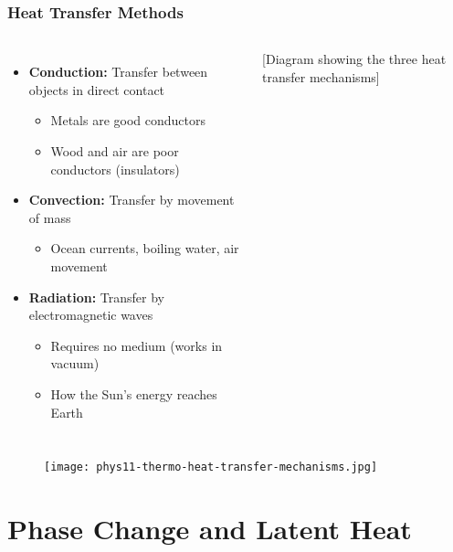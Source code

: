 \documentclass{beamer}
\begin{document}
\begin{frame}
    \frametitle{Heat Transfer Methods}
    \begin{columns}
        \begin{itemize}
            \item \textbf{Conduction:} Transfer between objects in direct contact
            \begin{itemize}
                \item Metals are good conductors
                \item Wood and air are poor conductors (insulators)
            \end{itemize}
            \item \textbf{Convection:} Transfer by movement of mass
            \begin{itemize}
                \item Ocean currents, boiling water, air movement
            \end{itemize}
            \item \textbf{Radiation:} Transfer by electromagnetic waves
            \begin{itemize}
                \item Requires no medium (works in vacuum)
                \item How the Sun's energy reaches Earth
            \end{itemize}
        \end{itemize}
        
        \begin{center}
            \alert{[Diagram showing the three heat transfer mechanisms]}
        \end{center}
    \end{columns}

    \end{frame}

\begin{frame}
\begin{figure}
    \centering
    \texttt{[image: phys11-thermo-heat-transfer-mechanisms.jpg]}
\end{figure}

\end{frame}



\section{Phase Change and Latent Heat}
\end{document}
